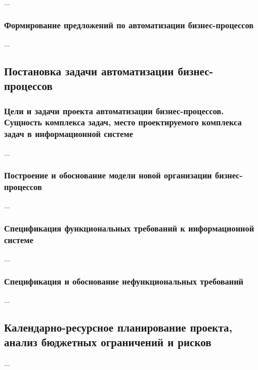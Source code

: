 \documentclass[../thesis.tex]{subfiles}
\begin{document}
...

\subsubsection{Формирование предложений по автоматизации бизнес-процессов}

...



\subsection{Постановка задачи автоматизации бизнес-процессов}
\subsubsection{Цели и задачи проекта автоматизации бизнес-процессов. Сущность комплекса задач, место проектируемого комплекса задач в информационной системе}

...

\subsubsection{Построение и обоснование модели новой организации бизнес-процессов}

...

\subsubsection{Спецификация функциональных требований к информационной системе}

...

\subsubsection{Спецификация и обоснование нефункциональных требований}

...



\subsection{Календарно-ресурсное планирование проекта, анализ бюджетных ограничений и рисков}

...
\end{document}
